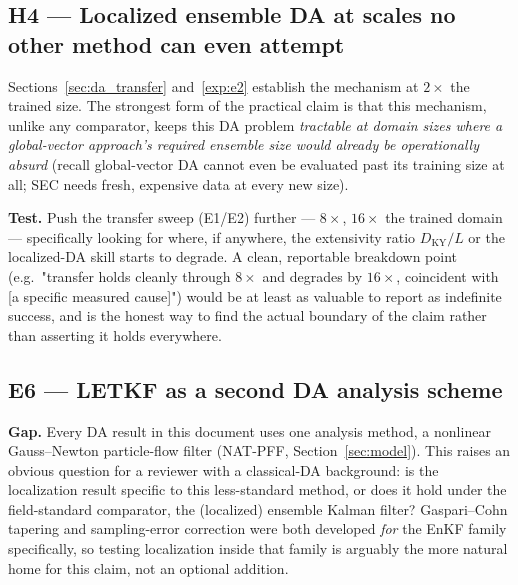 \documentclass[11pt]{article}
\begin{document}
\subsection{H4 --- Localized ensemble DA at scales no other method can even attempt}

Sections~\ref{sec:da_transfer} and~\ref{exp:e2} establish the
mechanism at $2\times$ the trained size. The strongest form of the
practical claim is that this mechanism, unlike any comparator, keeps
this DA problem \emph{tractable at domain sizes where a global-vector
approach's required ensemble size would already be operationally
absurd} (recall global-vector DA cannot even be evaluated past its
training size at all; SEC needs fresh, expensive data at every new
size).

\textbf{Test.} Push the transfer sweep (E1/E2) further --- $8\times$,
$16\times$ the trained domain --- specifically looking for where, if
anywhere, the extensivity ratio $D_{\mathrm{KY}}/L$ or the localized-DA
skill starts to degrade. A clean, reportable breakdown point (e.g.\ "transfer
holds cleanly through $8\times$ and degrades by $16\times$, coincident with
[a specific measured cause]") would be at least as valuable to report as
indefinite success, and is the honest way to find the actual boundary
of the claim rather than asserting it holds everywhere.

\subsection{E6 --- LETKF as a second DA analysis scheme}
\label{exp:e6}

\textbf{Gap.} Every DA result in this document uses one analysis
method, a nonlinear Gauss--Newton particle-flow filter (NAT-PFF,
Section~\ref{sec:model}). This raises an obvious question for a
reviewer with a classical-DA background: is the localization result
specific to this less-standard method, or does it hold under the
field-standard comparator, the (localized) ensemble Kalman filter?
Gaspari--Cohn tapering and sampling-error correction were both
developed \emph{for} the EnKF family specifically, so testing
localization inside that family is arguably the more natural home for
this claim, not an optional addition.
\end{document}
